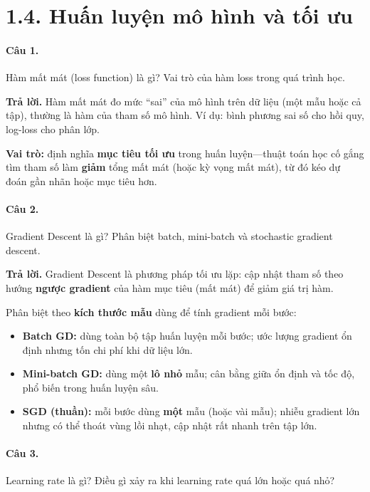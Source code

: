 \section*{1.4. Huấn luyện mô hình và tối ưu}

\paragraph{Câu 1.} Hàm mất mát (loss function) là gì? Vai trò của hàm loss trong quá trình học.

\medskip\noindent\textbf{Trả lời.} Hàm mất mát đo mức ``sai'' của mô hình trên dữ liệu (một mẫu hoặc cả tập), thường là hàm của tham số mô hình. Ví dụ: bình phương sai số cho hồi quy, log-loss cho phân lớp.

\textbf{Vai trò:} định nghĩa \textbf{mục tiêu tối ưu} trong huấn luyện---thuật toán học cố gắng tìm tham số làm \textbf{giảm} tổng mất mát (hoặc kỳ vọng mất mát), từ đó kéo dự đoán gần nhãn hoặc mục tiêu hơn.

\paragraph{Câu 2.} Gradient Descent là gì? Phân biệt batch, mini-batch và stochastic gradient descent.

\medskip\noindent\textbf{Trả lời.} Gradient Descent là phương pháp tối ưu lặp: cập nhật tham số theo hướng \textbf{ngược gradient} của hàm mục tiêu (mất mát) để giảm giá trị hàm.

Phân biệt theo \textbf{kích thước mẫu} dùng để tính gradient mỗi bước:
\begin{itemize}[nosep]
\item \textbf{Batch GD:} dùng toàn bộ tập huấn luyện mỗi bước; ước lượng gradient ổn định nhưng tốn chi phí khi dữ liệu lớn.
\item \textbf{Mini-batch GD:} dùng một \textbf{lô nhỏ} mẫu; cân bằng giữa ổn định và tốc độ, phổ biến trong huấn luyện sâu.
\item \textbf{SGD (thuần):} mỗi bước dùng \textbf{một} mẫu (hoặc vài mẫu); nhiễu gradient lớn nhưng có thể thoát vùng lồi nhạt, cập nhật rất nhanh trên tập lớn.
\end{itemize}

\paragraph{Câu 3.} Learning rate là gì? Điều gì xảy ra khi learning rate quá lớn hoặc quá nhỏ?

